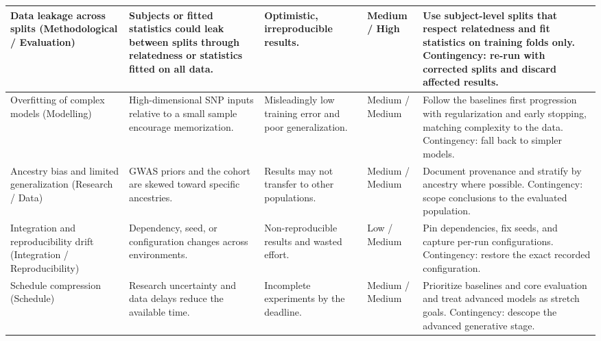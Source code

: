 {\begin{longtable}{|P{2.5cm}|P{3.3cm}|P{2.5cm}|P{1.6cm}|P{3.0cm}|}
Data leakage across splits \newline (Methodological / Evaluation) & Subjects or fitted statistics could leak between splits through relatedness or statistics fitted on all data. & Optimistic, irreproducible results. & Medium / High & Use subject-level splits that respect relatedness and fit statistics on training folds only. Contingency: re-run with corrected splits and discard affected results. \\ \hline
Overfitting of complex models \newline (Modelling) & High-dimensional SNP inputs relative to a small sample encourage memorization. & Misleadingly low training error and poor generalization. & Medium / Medium & Follow the baselines first progression with regularization and early stopping, matching complexity to the data. Contingency: fall back to simpler models. \\ \hline
Ancestry bias and limited generalization \newline (Research / Data) & GWAS priors and the cohort are skewed toward specific ancestries. & Results may not transfer to other populations. & Medium / Medium & Document provenance and stratify by ancestry where possible. Contingency: scope conclusions to the evaluated population. \\ \hline
Integration and reproducibility drift \newline (Integration / Reproducibility) & Dependency, seed, or configuration changes across environments. & Non-reproducible results and wasted effort. & Low / Medium & Pin dependencies, fix seeds, and capture per-run configurations. Contingency: restore the exact recorded configuration. \\ \hline
Schedule compression \newline (Schedule) & Research uncertainty and data delays reduce the available time. & Incomplete experiments by the deadline. & Medium / Medium & Prioritize baselines and core evaluation and treat advanced models as stretch goals. Contingency: descope the advanced generative stage. \\ \hline
\end{longtable}
}

